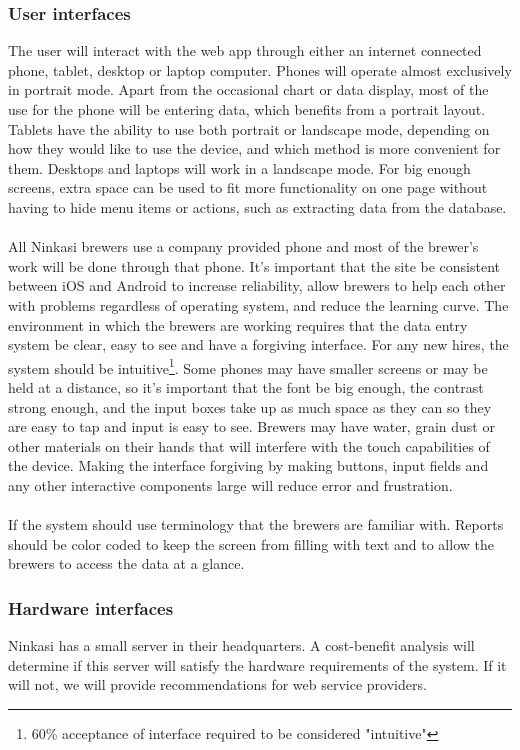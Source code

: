 \documentclass[draftclsnofoot,onecolumn,letterpaper,10pt,compsoc]{IEEEtran}
\begin{document}
		\subsubsection{User interfaces}
			The user will interact with the web app through either an internet connected phone, tablet, desktop or laptop computer.
			Phones will operate almost exclusively in portrait mode.
			Apart from the occasional chart or data display, most of the use for the phone will be entering data, which benefits from a portrait layout.
			Tablets have the ability to use both portrait or landscape mode, depending on how they would like to use the device, and which method is more convenient for them.
			Desktops and laptops will work in a landscape mode.
			For big enough screens, extra space can be used to fit more functionality on one page without having to hide menu items or actions, such as extracting data from the database.
			\\
			\\
			All Ninkasi brewers use a company provided phone and most of the brewer's work will be done through that phone.
			It's important that the site be consistent between iOS and Android to increase reliability, allow brewers to help each other with problems regardless of operating system, and reduce the learning curve.
			The environment in which the brewers are working requires that the data entry system be clear, easy to see and have a forgiving interface.
			For any new hires, the system should be intuitive\footnote{60\% acceptance of interface required to be considered "intuitive"}.
			Some phones may have smaller screens or may be held at a distance, so it's important that the font be big enough, the contrast strong enough, and the input boxes take up as much space as they can so they are easy to tap and input is easy to see.
			Brewers may have water, grain dust or other materials on their hands that will interfere with the touch capabilities of the device.
			Making the interface forgiving by making buttons, input fields and any other interactive components large will reduce error and frustration.
			\\
			\\
			If the system should use terminology that the brewers are familiar with.
			Reports should be color coded to keep the screen from filling with text and to allow the brewers to access the data at a glance.

		\subsubsection{Hardware interfaces}
			Ninkasi has a small server in their headquarters.
			A cost-benefit analysis will determine if this server will satisfy the hardware requirements of the system.
			If it will not, we will provide recommendations for web service providers.
\end{document}
